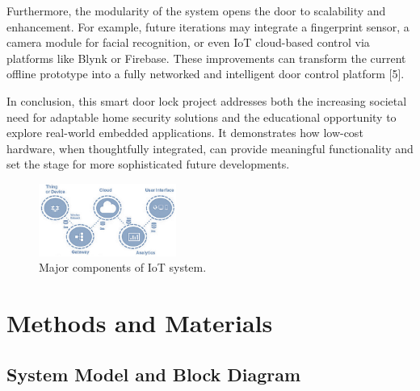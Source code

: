 \documentclass[conference, onecolumn]{IEEEtran}
\begin{document}
Furthermore, the modularity of the system opens the door to scalability and enhancement. For example, future iterations may integrate a fingerprint sensor, a camera module for facial recognition, or even IoT cloud-based control via platforms like Blynk or Firebase. These improvements can transform the current offline prototype into a fully networked and intelligent door control platform [5].

In conclusion, this smart door lock project addresses both the increasing societal need for adaptable home security solutions and the educational opportunity to explore real-world embedded applications. It demonstrates how low-cost hardware, when thoughtfully integrated, can provide meaningful functionality and set the stage for more sophisticated future developments.

\begin{figure}[htb]
	\centering
	\includegraphics[width=0.4\textwidth]{IoT_Components.jpg}
	\caption{Major components of IoT system.}
	\label{fig1}
\end{figure}

\section{Methods and Materials}

\subsection{System Model and Block Diagram}
\end{document}

